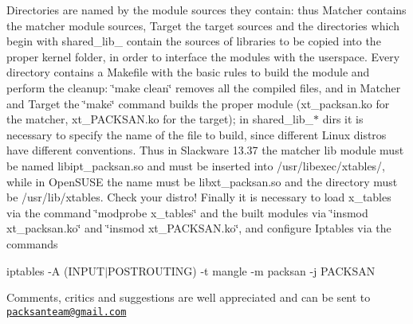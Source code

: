 Directories are named by the module sources they contain: thus Matcher contains the matcher module sources, Target the target sources and the directories which begin with shared\_\-lib\_\- contain the sources of libraries to be copied into the proper kernel folder, in order to interface the modules with the userspace. Every directory contains a Makefile with the basic rules to build the module and perform the cleanup: \char`\"{}make clean\char`\"{} removes all the compiled files, and in Matcher and Target the \char`\"{}make\char`\"{} command builds the proper module (xt\_\-packsan.ko for the matcher, xt\_\-PACKSAN.ko for the target); in shared\_\-lib\_\-$\ast$ dirs it is necessary to specify the name of the file to build, since different Linux distros have different conventions. Thus in Slackware 13.37 the matcher lib module must be named libipt\_\-packsan.so and must be inserted into /usr/libexec/xtables/, while in OpenSUSE the name must be libxt\_\-packsan.so and the directory must be /usr/lib/xtables. Check your distro! Finally it is necessary to load x\_\-tables via the command \char`\"{}modprobe x\_\-tables\char`\"{} and the built modules via \char`\"{}insmod xt\_\-packsan.ko\char`\"{} and \char`\"{}insmod xt\_\-PACKSAN.ko\char`\"{}, and configure Iptables via the commands

iptables -\/A (INPUT$|$POSTROUTING) -\/t mangle -\/m packsan -\/j PACKSAN

Comments, critics and suggestions are well appreciated and can be sent to \href{mailto:packsanteam@gmail.com}{\tt packsanteam@gmail.com} 